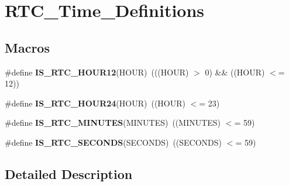 \hypertarget{group___r_t_c___time___definitions}{\section{R\-T\-C\-\_\-\-Time\-\_\-\-Definitions}
\label{group___r_t_c___time___definitions}
}
\subsection*{Macros}
\begin{DoxyCompactItemize}
\item 
\hypertarget{group___r_t_c___time___definitions_ga6bdfe3bed0a57dfafc2d1de785d48a62}{\#define {\bfseries I\-S\-\_\-\-R\-T\-C\-\_\-\-H\-O\-U\-R12}(H\-O\-U\-R)~(((H\-O\-U\-R) $>$ 0) \&\& ((H\-O\-U\-R) $<$= 12))}\label{group___r_t_c___time___definitions_ga6bdfe3bed0a57dfafc2d1de785d48a62}

\item 
\hypertarget{group___r_t_c___time___definitions_ga4883613bec76074ac62608b89e3f48a8}{\#define {\bfseries I\-S\-\_\-\-R\-T\-C\-\_\-\-H\-O\-U\-R24}(H\-O\-U\-R)~((H\-O\-U\-R) $<$= 23)}\label{group___r_t_c___time___definitions_ga4883613bec76074ac62608b89e3f48a8}

\item 
\hypertarget{group___r_t_c___time___definitions_ga8475ceaf2d35d98be0b3401812aef445}{\#define {\bfseries I\-S\-\_\-\-R\-T\-C\-\_\-\-M\-I\-N\-U\-T\-E\-S}(M\-I\-N\-U\-T\-E\-S)~((M\-I\-N\-U\-T\-E\-S) $<$= 59)}\label{group___r_t_c___time___definitions_ga8475ceaf2d35d98be0b3401812aef445}

\item 
\hypertarget{group___r_t_c___time___definitions_gadb5a39d98fc906a8ea035bd29308bc5c}{\#define {\bfseries I\-S\-\_\-\-R\-T\-C\-\_\-\-S\-E\-C\-O\-N\-D\-S}(S\-E\-C\-O\-N\-D\-S)~((S\-E\-C\-O\-N\-D\-S) $<$= 59)}\label{group___r_t_c___time___definitions_gadb5a39d98fc906a8ea035bd29308bc5c}

\end{DoxyCompactItemize}


\subsection{Detailed Description}
